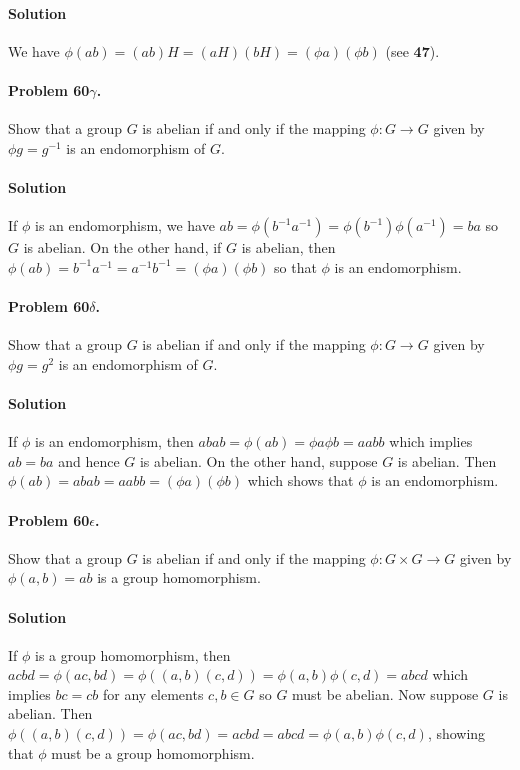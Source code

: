\paragraph*{Solution}
We have $\phi (ab) = (ab)H = (aH)(bH) = (\phi a)(\phi b)$ (see \textbf{47}).

\paragraph{Problem 60$\gamma$.}
Show that a group $G$ is abelian if and only if the mapping $\phi : G \rightarrow
G$ given by $\phi g = g^{-1}$ is an endomorphism of $G$.

\paragraph*{Solution}
If $\phi$ is an endomorphism, we have $ab = \phi(b^{-1}a^{-1}) = \phi(b^{-1})\phi(a^{-1})
= ba$ so $G$ is abelian. On the other hand, if $G$ is abelian, then $\phi (ab)
= b^{-1}a^{-1} = a^{-1}b^{-1} = (\phi a)(\phi b)$ so that $\phi$ is an endomorphism.

\paragraph{Problem 60$\delta$.}
Show that a group $G$ is abelian if and only if the mapping $\phi : G \rightarrow
G$ given by $\phi g = g^2$ is an endomorphism of $G$.

\paragraph*{Solution}
If $\phi$ is an endomorphism, then $abab = \phi(ab) = \phi a \phi b = aabb$ which
implies $ab = ba$ and hence $G$ is abelian. On the other hand, suppose $G$ is
abelian. Then $\phi (ab) = abab = aabb = (\phi a)(\phi b)$ which shows that $\phi$
is an endomorphism.

\paragraph{Problem 60$\epsilon$.}
Show that a group $G$ is abelian if and only if the mapping $\phi : G \times G \rightarrow
G$ given by $\phi (a,b) = ab$ is a group homomorphism.

\paragraph*{Solution}
If $\phi$ is a group homomorphism, then $acbd = \phi(ac,bd) = \phi((a,b)(c,d))
= \phi(a,b)\phi(c,d) = abcd$ which implies $bc = cb$ for any elements $c,b \in G$
so $G$ must be abelian. Now suppose $G$ is abelian. Then $\phi ((a,b)(c,d)) =
\phi (ac,bd) = acbd = abcd = \phi(a,b)\phi(c,d)$, showing that $\phi$ must be
a group homomorphism.


